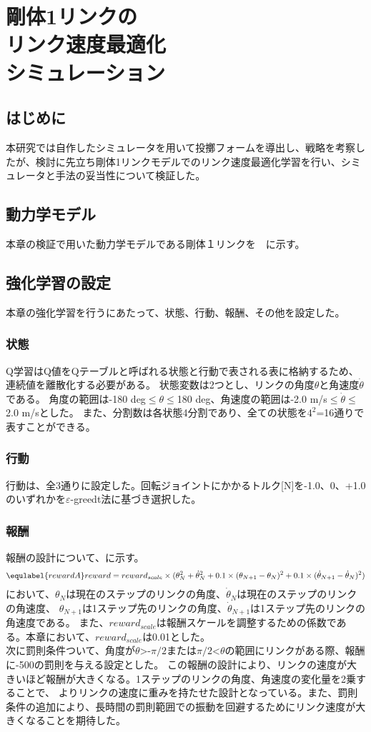 \chapter[剛体1リンクのリンク速度最適化シミュレーション]{剛体1リンクの\\リンク速度最適化\\シミュレーション}

\section{はじめに}
本研究では自作したシミュレータを用いて投擲フォームを導出し、戦略を考察したが、検討に先立ち剛体1リンクモデルでのリンク速度最適化学習を行い、シミュレータと手法の妥当性について検証した。
\section{動力学モデル}
本章の検証で用いた動力学モデルである剛体１リンクを　に示す。
\section{強化学習の設定}
本章の強化学習を行うにあたって、状態、行動、報酬、その他を設定した。
\subsection{状態}
Q学習はQ値をQテーブルと呼ばれる状態と行動で表される表に格納するため、連続値を離散化する必要がある。
状態変数は2つとし、リンクの角度$\theta$と角速度$\dot{\theta}$である。
角度の範囲は-180 deg$\leq$$\theta$$\leq$180 deg、角速度の範囲は-2.0 m/s$\leq$$\dot{\theta}$$\leq$2.0 m/sとした。
また、分割数は各状態4分割であり、全ての状態を$4^{2}$=16通りで表すことができる。
\subsection{行動}
行動は、全3通りに設定した。回転ジョイントにかかるトルク[N]を-1.0、0、+1.0のいずれかを$\varepsilon$-greedt法に基づき選択した。
\subsection{報酬}
報酬の設計について、に示す。
\begin{eqnarray}
  \equlabel{rewardA}
  reward=reward_{scale}\times(\theta_N^2+\dot{\theta}_N^2
  +0.1\times(\theta_{N+1}-\theta_N)^2
  +0.1\times(\dot{\theta}_{N+1}-\dot{\theta}_N)^2)
\end{eqnarray}
において、$\theta_N$は現在のステップのリンクの角度、$\dot{\theta}_N$は現在のステップのリンクの角速度、
$\theta_{N+1}$は1ステップ先のリンクの角度、$\dot{\theta}_{N+1}$は1ステップ先のリンクの角速度である。
また、$reward_{scale}$は報酬スケールを調整するための係数である。本章において、$reward_{scale}$は0.01とした。\\
次に罰則条件ついて、角度が$\theta$>-$\pi/2$または$\pi/2$<$\theta$の範囲にリンクがある際、報酬に-500の罰則を与える設定とした。
この報酬の設計により、リンクの速度が大きいほど報酬が大きくなる。1ステップのリンクの角度、角速度の変化量を2乗することで、
よりリンクの速度に重みを持たせた設計となっている。また、罰則条件の追加により、長時間の罰則範囲での振動を回避するためにリンク速度が大きくなることを期待した。
